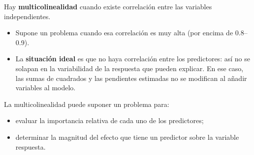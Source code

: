 \begin{definicion}
  Hay \textbf{multicolinealidad} cuando existe correlación entre las variables independientes.
\end{definicion}

\begin{itemize}
  \item Supone un problema cuando esa correlación es muy alta (por encima de 0.8--0.9).
  \item La \textbf{situación ideal} es que no haya correlación entre los predictores: así no se
    solapan en la variabilidad de la respuesta que pueden explicar. En ese caso, las sumas de
    cuadrados y las pendientes estimadas no se modifican al añadir variables al modelo.
\end{itemize}
La multicolinealidad puede suponer un problema para:
\begin{itemize}
  \item evaluar la importancia relativa de cada uno de los predictores;
  \item determinar la magnitud del efecto que tiene un predictor sobre la variable respuesta.
\end{itemize}

